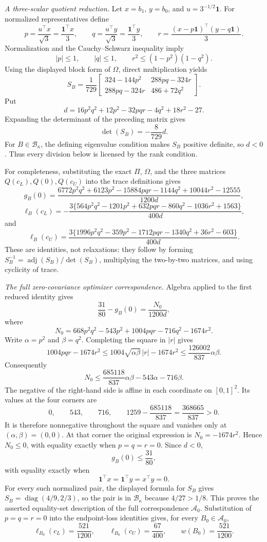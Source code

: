 \emph{A three-scalar quotient reduction.}
Let \(x=b_1\), \(y=b_0\), and \(u=3^{-1/2}\mathbf 1\).  For normalized representatives define
\[
p=\frac{u^{\top}x}{\sqrt3}=\frac{\mathbf 1^{\top}x}{3},
\qquad
q=\frac{u^{\top}y}{\sqrt3}=\frac{\mathbf 1^{\top}y}{3},
\qquad
r=\frac{(x-p\mathbf 1)^{\top}(y-q\mathbf 1)}{3}.
\]
Normalization and the Cauchy--Schwarz inequality imply
\[
|p|\le1,
\qquad |q|\le1,
\qquad r^2\le(1-p^2)(1-q^2).
\]
Using the displayed block form of \(\Omega\), direct multiplication yields
\[
S_B=\frac1{729}
\begin{bmatrix}
324-144p^2&288pq-324r\\
288pq-324r&486+72q^2
\end{bmatrix}.
\]
Put
\[
d=16p^2q^2+12p^2-32pqr-4q^2+18r^2-27.
\]
Expanding the determinant of the preceding matrix gives
\[
\det(S_B)=-\frac8{729}d.
\]
For \(B\in\mathcal B_\kappa\), the defining eigenvalue condition makes \(S_B\) positive definite, so \(d<0\).  Thus every division below is licensed by the rank condition.

For completeness, substituting the exact \(\Pi\), \(\Omega\), and the three matrices \(Q(c_L),Q(0),Q(c_U)\) into the trace definitions gives
\[
g_B(0)=
\frac{6772p^2q^2+6123p^2-15884pqr-1144q^2+10044r^2-12555}
{1200d},
\]
\[
\ell_B(c_L)=
-\frac{3\{564p^2q^2-1201p^2+632pqr-860q^2-1036r^2+1563\}}
{400d},
\]
and
\[
\ell_B(c_U)=
\frac{3\{1996p^2q^2-359p^2-1712pqr-1340q^2+36r^2-603\}}
{400d}.
\]
These are identities, not relaxations: they follow by forming \(S_B^{-1}=\operatorname{adj}(S_B)/\det(S_B)\), multiplying the two-by-two matrices, and using cyclicity of trace.

\emph{The full zero-covariance optimizer correspondence.}
Algebra applied to the first reduced identity gives
\[
\frac{31}{80}-g_B(0)=\frac{N_0}{1200d},
\]
where
\[
N_0=668p^2q^2-543p^2+1004pqr-716q^2-1674r^2.
\]
Write \(\alpha=p^2\) and \(\beta=q^2\).  Completing the square in \(|r|\) gives
\[
1004pqr-1674r^2
\le1004\sqrt{\alpha\beta}\,|r|-1674r^2
\le\frac{126002}{837}\alpha\beta.
\]
Consequently
\[
N_0\le
\frac{685118}{837}\alpha\beta-543\alpha-716\beta.
\]
The negative of the right-hand side is affine in each coordinate on \([0,1]^2\).  Its values at the four corners are
\[
0,\qquad 543,\qquad716,\qquad
1259-\frac{685118}{837}=\frac{368665}{837}>0.
\]
It is therefore nonnegative throughout the square and vanishes only at \((\alpha,\beta)=(0,0)\).  At that corner the original expression is \(N_0=-1674r^2\).  Hence \(N_0\le0\), with equality exactly when \(p=q=r=0\).  Since \(d<0\),
\[
g_B(0)\le\frac{31}{80},
\]
with equality exactly when
\[
\mathbf 1^{\top}x=\mathbf 1^{\top}y=x^{\top}y=0.
\]
For every such normalized pair, the displayed formula for \(S_B\) gives \(S_B=\operatorname{diag}(4/9,2/3)\), so the pair is in \(\mathcal B_\kappa\) because \(4/27>1/8\).  This proves the asserted equality-set description of the full correspondence \(\mathcal A_0\).  Substitution of \(p=q=r=0\) into the endpoint-loss identities gives, for every \(B_0\in\mathcal A_0\),
\[
\ell_{B_0}(c_L)=\frac{521}{1200},
\qquad
\ell_{B_0}(c_U)=\frac{67}{400},
\qquad
w(B_0)=\frac{521}{1200}.
\]

